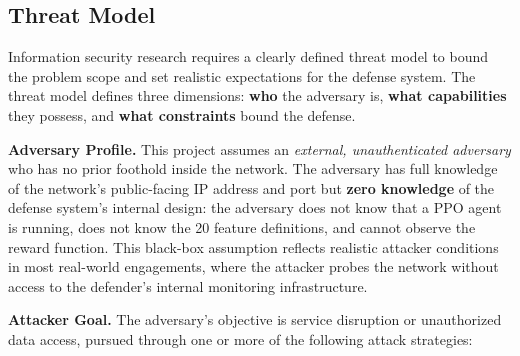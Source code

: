 \documentclass[12pt,a4paper]{report}
\begin{document}
\subsection{Threat Model}

Information security research requires a clearly defined threat model to bound the problem scope and set realistic expectations for the defense system. The threat model defines three dimensions: \textbf{who} the adversary is, \textbf{what capabilities} they possess, and \textbf{what constraints} bound the defense.

\textbf{Adversary Profile.} This project assumes an \textit{external, unauthenticated adversary} who has no prior foothold inside the network. The adversary has full knowledge of the network's public-facing IP address and port but \textbf{zero knowledge} of the defense system's internal design: the adversary does not know that a PPO agent is running, does not know the 20 feature definitions, and cannot observe the reward function. This black-box assumption reflects realistic attacker conditions in most real-world engagements, where the attacker probes the network without access to the defender's internal monitoring infrastructure.

\textbf{Attacker Goal.} The adversary's objective is service disruption or unauthorized data access, pursued through one or more of the following attack strategies:
\end{document}
